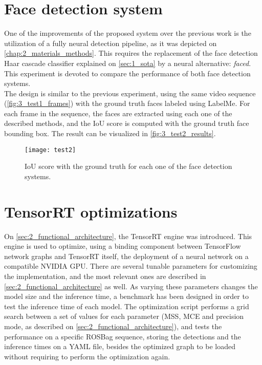 \section{Face detection system}

One of the improvements of the proposed system over the previous work \cite{tfg} is the utilization of a fully neural detection pipeline, as it was depicted on \autoref{chap:2_materials_methods}. This requires the replacement of the face detection Haar cascade classifier explained on \autoref{sec:1_sota} by a neural alternative: \textit{faced}. This experiment is devoted to compare the performance of both face detection systems.\\

The design is similar to the previous experiment, using the same video sequence (\autoref{fig:3_test1_frames}) with the ground truth faces labeled using LabelMe. For each frame in the sequence, the faces are extracted using each one of the described methods, and the IoU score is computed with the ground truth face bounding box. The result can be visualized in \autoref{fig:3_test2_results}.

\begin{figure}[h]
	\centering
	\texttt{[image: test2]}
	\caption{IoU score with the ground truth for each one of the face detection systems.}
	\label{fig:3_test2_results}
\end{figure}


\section{TensorRT optimizations}

On \autoref{sec:2_functional_architecture}, the TensorRT engine was introduced. This engine is used to optimize, using a binding component between TensorFlow network graphs and TensorRT itself, the deployment of a neural network on a compatible NVIDIA GPU. There are several tunable parameters for customizing the implementation, and the most relevant ones are described in \autoref{sec:2_functional_architecture} as well. As varying these parameters changes the model size and the inference time, a benchmark has been designed in order to test the inference time of each model. The optimization script performs a grid search between a set of values for each parameter (MSS, MCE and precision mode, as described on \autoref{sec:2_functional_architecture}), and tests the performance on a specific ROSBag sequence, storing the detections and the inference times on a YAML file, besides the optimized graph to be loaded without requiring to perform the optimization again.\\

